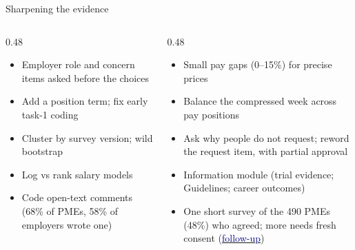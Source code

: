 \begin{frame}[t,label=B-nextsteps]{Sharpening the evidence}
  \FrameTop
  \begin{columns}[T,onlytextwidth]
    \begin{column}{0.48\textwidth}
      \begin{itemize}\setlength{\itemsep}{0.08cm}
        \item Employer role and concern items asked before the choices
        \item Add a position term; fix early task-1 coding
        \item Cluster by survey version; wild bootstrap
        \item Log vs rank salary models
        \item Code open-text comments (68\% of PMEs, 58\% of employers wrote one)
      \end{itemize}
    \end{column}
    \begin{column}{0.48\textwidth}
      \begin{itemize}\setlength{\itemsep}{0.08cm}
        \item Small pay gaps (0--15\%) for precise prices
        \item Balance the compressed week across pay positions
        \item Ask why people do not request; reword the request item, with partial approval
        \item Information module (trial evidence; Guidelines; career outcomes)
        \item One short survey of the 490 PMEs (48\%) who agreed; more needs fresh consent (\hyperlink{B-followup}{\textcolor{Navy}{follow-up}})
      \end{itemize}
    \end{column}
  \end{columns}
\end{frame}

